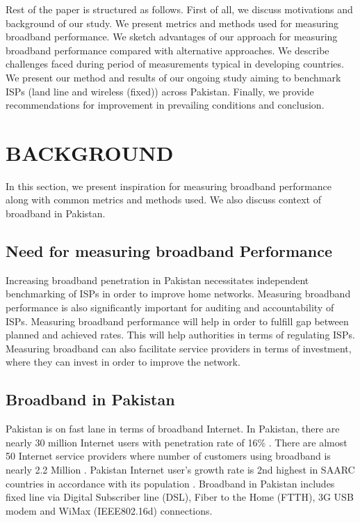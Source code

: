 \documentclass{sig-alternate-10pt}
\begin{document}
\indent Rest of the paper is structured as follows.  First of all, we discuss motivations and background of our study. We present metrics and methods used for measuring broadband performance. We sketch advantages of our approach for measuring broadband performance compared with alternative approaches. We describe challenges faced during period of measurements typical in developing countries. We present our method and results of our ongoing study aiming to benchmark ISPs (land line and wireless (fixed)) across Pakistan.  Finally, we provide recommendations for improvement in prevailing conditions and conclusion.\\

\section{BACKGROUND}
In this section, we present inspiration for measuring broadband performance along with common metrics and methods used. We also discuss context of broadband in Pakistan.
\subsection {Need for measuring broadband Performance}
Increasing broadband penetration in Pakistan necessitates independent benchmarking of ISPs in order to improve home networks. Measuring broadband performance is also significantly important for auditing and accountability of ISPs. Measuring broadband performance will help in order to fulfill gap between planned and achieved rates. This will help authorities in terms of regulating ISPs. Measuring broadband can also facilitate service providers in terms of investment, where they can invest in order to improve the network.\\
\subsection {Broadband in Pakistan}
Pakistan is on fast lane in terms of broadband Internet. In Pakistan, there are nearly 30 million Internet users with penetration rate of 16\% \cite{01}. There are almost 50 Internet service providers \cite{01} where number of customers using broadband is nearly 2.2 Million \cite{02}. Pakistan Internet user's growth rate is 2nd highest in SAARC countries in accordance with its population \cite{02}. Broadband in Pakistan includes fixed line via Digital Subscriber line (DSL), Fiber to the Home (FTTH), 3G USB modem and WiMax (IEEE802.16d) connections.\\
\end{document}
